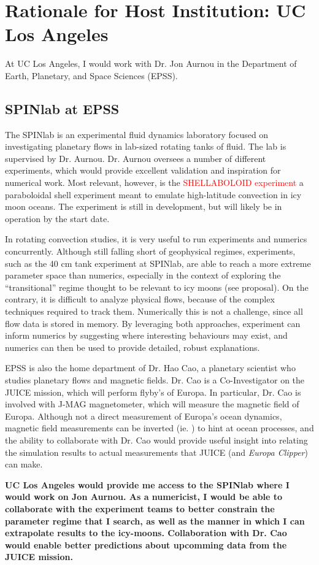 \documentclass{article}
\title{}
\author{}
\date{}
\begin{document}
\section*{Rationale for Host Institution: UC Los Angeles}
At UC Los Angeles, I would work with Dr. Jon Aurnou in the Department of Earth, Planetary, and Space Sciences (EPSS).
\subsection*{SPINlab at EPSS}
The SPINlab is an experimental fluid dynamics laboratory focused on investigating planetary flows in lab-sized rotating tanks of fluid. The lab is supervised by Dr. Aurnou. Dr. Aurnou oversees a number of different experiments, which would provide excellent validation and inspiration for numerical work. Most relevant, however, is the \textcolor{red}{SHELLABOLOID experiment} a paraboloidal shell experiment meant to emulate high-latitude convection in icy moon oceans. The experiment is still in development, but will likely be in operation by the start date. 

In rotating convection studies, it is very useful to run experiments and numerics concurrently. Although still falling short of geophysical regimes, experiments, such as the 40 cm tank experiment\cite{jA23} at SPINlab, are able to reach a more extreme parameter space than numerics, especially in the context of exploring the ``transitional'' regime thought to be relevant to icy moons (see proposal). On the contrary, it is difficult to analyze physical flows, because of the complex techniques required to track them. Numerically this is not a challenge, since all flow data is stored in memory. By leveraging both approaches, experiment can inform numerics by suggesting where interesting behaviours may exist, and numerics can then be used to provide detailed, robust explanations.

EPSS is also the home department of Dr. Hao Cao, a planetary scientist who studies planetary flows and magnetic fields. Dr. Cao is a Co-Investigator on the JUICE mission, which will perform flyby's of Europa. In particular, Dr. Cao is involved with J-MAG magnetometer, which will measure the magnetic field of Europa.
Although not a direct measurement of Europa's ocean dynamics, magnetic field measurements can be inverted (ie. \cite{nG15,dJ88}) to hint at ocean processes, and the ability to collaborate with Dr. Cao would provide useful insight into relating the simulation results to actual measurements that JUICE (and \textit{Europa Clipper}) can make.

\textbf{UC Los Angeles would provide me access to the SPINlab where I would work on Jon Aurnou. As a numericist, I would be able to collaborate with the experiment teams to better constrain the parameter regime that I search, as well as the manner in which I can extrapolate results to the icy-moons. Collaboration with Dr. Cao would enable better predictions about upcomming data from the JUICE mission.}
\printbibliography
\end{document}
